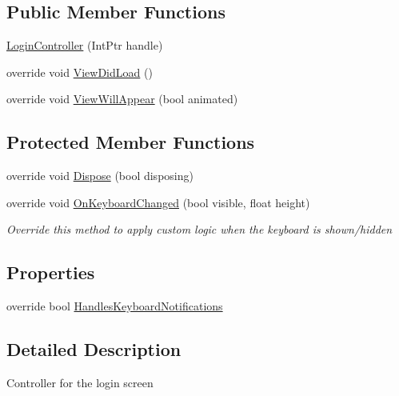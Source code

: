 \subsection*{Public Member Functions}
\begin{DoxyCompactItemize}
\item 
\hyperlink{class_field_service_1_1i_o_s_1_1_login_controller_a1129421003c64566662f8d156f75d4ae}{Login\+Controller} (Int\+Ptr handle)
\item 
override void \hyperlink{class_field_service_1_1i_o_s_1_1_login_controller_ac86aee5f609ce3d98eea0d92733b8876}{View\+Did\+Load} ()
\item 
override void \hyperlink{class_field_service_1_1i_o_s_1_1_login_controller_a3350240076bc16dc969450b082a0b8e7}{View\+Will\+Appear} (bool animated)
\end{DoxyCompactItemize}
\subsection*{Protected Member Functions}
\begin{DoxyCompactItemize}
\item 
override void \hyperlink{class_field_service_1_1i_o_s_1_1_login_controller_af7115d16096cf2eaf409749db6876abc}{Dispose} (bool disposing)
\item 
override void \hyperlink{class_field_service_1_1i_o_s_1_1_login_controller_a5071d7cae49acfa60a6c2fe6c78cf856}{On\+Keyboard\+Changed} (bool visible, float height)
\begin{DoxyCompactList}\small\item\em Override this method to apply custom logic when the keyboard is shown/hidden \end{DoxyCompactList}\end{DoxyCompactItemize}
\subsection*{Properties}
\begin{DoxyCompactItemize}
\item 
override bool \hyperlink{class_field_service_1_1i_o_s_1_1_login_controller_a11e5e7e6c78c42a8b87bbd2de93b0136}{Handles\+Keyboard\+Notifications}
\end{DoxyCompactItemize}


\subsection{Detailed Description}
Controller for the login screen 



